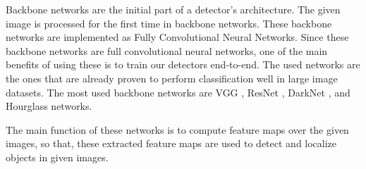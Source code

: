 \documentclass{article}
\begin{document}
\setlength{\parindent}{6ex}

\indent

Backbone networks are the initial part of a detector's architecture.
The given image is processed for the first time in backbone networks.
These backbone networks are implemented as Fully Convolutional Neural
Networks. Since these backbone networks are full convolutional neural networks, 
one of the main benefits of using these is to train our detectors end-to-end. 
The used networks are the ones that are already proven to perform 
classification well in large image datasets. The most used backbone networks 
are VGG \cite{vggcite}, ResNet \cite{resnetcite}, DarkNet \cite{darknetcite}, 
and Hourglass \cite{hourglasscite} networks.
\indent

The main function of these networks is to compute feature maps over the given 
images, so that, these extracted feature maps are used to detect and localize 
objects in given images.
\end{document}

